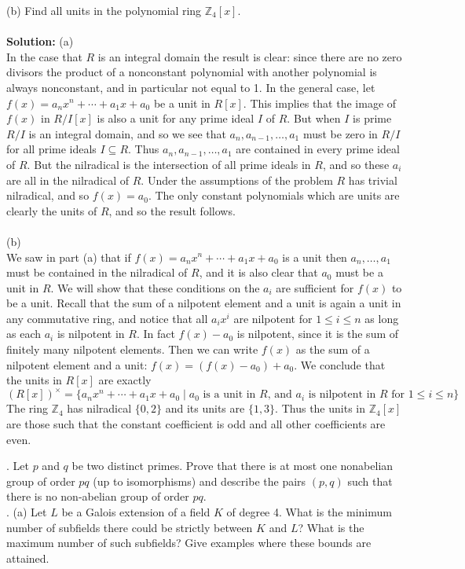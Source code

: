 \documentclass[11pt]{article}
\newcommand{\Z}{\mathbb{Z}}
\begin{document}
(b) Find all units in the polynomial ring $\Z_4[x]$.\\\\
\textbf{Solution:}
(a)\\
In the case that $R$ is an integral domain the result is clear: since there are no zero divisors the product of a nonconstant polynomial with another polynomial is always nonconstant, and in particular not equal to 1. In the general case, let $f(x) = a_nx^n + \cdots + a_1 x + a_0$ be a unit in $R[x]$. This implies that the image of $f(x)$ in $R/I[x]$ is also a unit for any prime ideal $I$ of $R$. But when $I$ is prime $R/I$ is an integral domain, and so we see that $a_n,a_{n-1},\ldots, a_1$ must be zero in $R/I$ for all prime ideals $I\subseteq R$. Thus $a_n,a_{n-1},\ldots, a_1$ are contained in every prime ideal of $R$. But the nilradical is the intersection of all prime ideals in $R$, and so these $a_i$ are all in the nilradical of $R$. Under the assumptions of the problem $R$ has trivial nilradical, and so $f(x) = a_0$. The only constant polynomials which are units are clearly the units of $R$, and so the result follows.\\\\
(b)\\
We saw in part (a) that if $f(x) = a_nx^n + \cdots + a_1 x + a_0$ is a unit then $a_n,\ldots, a_1$ must be contained in the nilradical of $R$, and it is also clear that $a_0$ must be a unit in $R$. We will show that these conditions on the $a_i$ are sufficient for $f(x)$ to be a unit. Recall that the sum of a nilpotent element and a unit is again a unit in any commutative ring, and notice that all $a_ix^i$ are nilpotent for $1\le i \le n$ as long as each $a_i$ is nilpotent in $R$. In fact $f(x)-a_0$ is nilpotent, since it is the sum of finitely many nilpotent elements. Then we can write $f(x)$ as the sum of a nilpotent element and a unit: $f(x) = (f(x)-a_0) + a_0$. We conclude that the units in $R[x]$ are exactly \[
(R[x])^\times = \{a_nx^n + \cdots + a_1 x + a_0 \mid a_0\text{ is a unit in $R$, and $a_i$ is nilpotent in $R$ for $1\le i \le n$}\}
\]
The ring $\Z_4$ has nilradical $\{0,2\}$ and its units are $\{1,3\}$. Thus the units in $\Z_4[x]$ are those such that the constant coefficient is odd and all other coefficients are even. 



. Let $p$ and $q$ be two distinct primes. Prove that there is at most one nonabelian
group of order $pq$ (up to isomorphisms) and describe the pairs $(p, q)$ such
that there is no non-abelian group of order $pq$.\\
. (a) Let $L$ be a Galois extension of a field $K$ of degree 4. What is the minimum
number of subfields there could be strictly between $K$ and $L$? What is the maximum
number of such subfields? Give examples where these bounds are attained.
\end{document}
